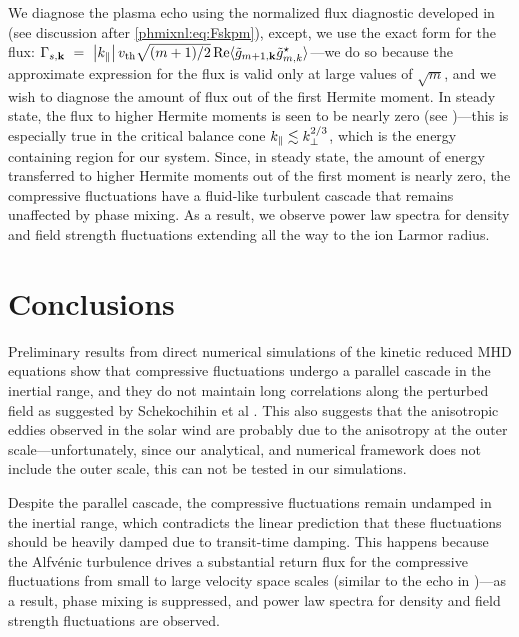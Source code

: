     We diagnose the plasma echo using the normalized flux diagnostic developed in 
    (see discussion after \eqref{phmixnl:eq:Fskpm}), except, we use the exact form for the
    flux: $\Gamma_{s,\mathbf{k}}~=~\left|k_\parallel\right| v_{\rm th} \sqrt{(m+1)/2} \, {\rm Re} \langle
\tilde g_{m+1,\mathbf{k}} \tilde g_{m,k}^\star \rangle$---we do so because the approximate expression for the flux is
valid only at large values of $\sqrt{m}$, and we wish to diagnose the amount of flux out
of the first Hermite moment.
In steady state, the flux to higher Hermite moments is seen to be nearly zero 
(see )---this is especially true in the critical balance cone
$k_\parallel \lesssim k_\perp^{2/3}$, which is the energy containing region for our system.
    Since, in steady state, the amount of energy transferred to 
    higher Hermite moments out of the first moment is
    nearly zero, the compressive fluctuations have a fluid-like turbulent cascade that
    remains unaffected by phase mixing. As a result, we observe power law spectra for
    density and field strength fluctuations extending all the way to the ion Larmor radius.

\section{Conclusions}
    
    Preliminary results from direct numerical simulations of the kinetic reduced MHD
    equations show
    that compressive fluctuations undergo a parallel cascade in the inertial range, and
    they do not maintain long correlations along the perturbed field as suggested by
    Schekochihin et al \cite{tome}. This also suggests that the anisotropic eddies
    observed in the solar wind \cite{chen11} are probably due to the anisotropy at the
    outer scale---unfortunately, since our analytical, and numerical framework does not
    include the outer scale, this can not be tested in our simulations. 

    Despite the parallel cascade, the compressive fluctuations remain undamped in the
    inertial range, which contradicts the linear prediction that these fluctuations should
    be heavily damped due to transit-time damping. This happens because the Alfv\'{e}nic turbulence drives a
    substantial return flux for the compressive fluctuations from small to large velocity
    space scales (similar to the echo in )---as a result, phase
    mixing is suppressed, and power law spectra for density and field strength
    fluctuations are observed.
